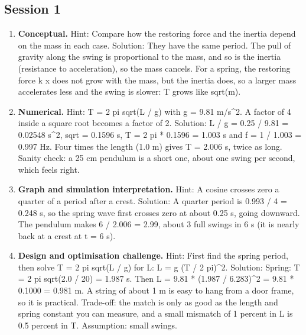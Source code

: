 \documentclass[11pt,a4paper]{article}
\begin{document}
\subsection*{Session 1}
\begin{enumerate}[nosep]
\item \textbf{Conceptual.} Hint: Compare how the restoring force and the inertia depend on the mass in each case. Solution: They have the same period. The pull of gravity along the swing is proportional to the mass, and so is the inertia (resistance to acceleration), so the mass cancels. For a spring, the restoring force k x does not grow with the mass, but the inertia does, so a larger mass accelerates less and the swing is slower: T grows like sqrt(m).
\item \textbf{Numerical.} Hint: T = 2 pi sqrt(L / g) with g = 9.81 m/s\textasciicircum{}2. A factor of 4 inside a square root becomes a factor of 2. Solution: L / g = 0.25 / 9.81 = 0.02548 s\textasciicircum{}2, sqrt = 0.1596 s, T = 2 pi * 0.1596 = 1.003 s and f = 1 / 1.003 = 0.997 Hz. Four times the length (1.0 m) gives T = 2.006 s, twice as long. Sanity check: a 25 cm pendulum is a short one, about one swing per second, which feels right.
\item \textbf{Graph and simulation interpretation.} Hint: A cosine crosses zero a quarter of a period after a crest. Solution: A quarter period is 0.993 / 4 = 0.248 s, so the spring wave first crosses zero at about 0.25 s, going downward. The pendulum makes 6 / 2.006 = 2.99, about 3 full swings in 6 s (it is nearly back at a crest at t = 6 s).
\item \textbf{Design and optimisation challenge.} Hint: First find the spring period, then solve T = 2 pi sqrt(L / g) for L: L = g (T / 2 pi)\textasciicircum{}2. Solution: Spring: T = 2 pi sqrt(2.0 / 20) = 1.987 s. Then L = 9.81 * (1.987 / 6.283)\textasciicircum{}2 = 9.81 * 0.1000 = 0.981 m. A string of about 1 m is easy to hang from a door frame, so it is practical. Trade-off: the match is only as good as the length and spring constant you can measure, and a small mismatch of 1 percent in L is 0.5 percent in T. Assumption: small swings.
\end{enumerate}
\end{document}
